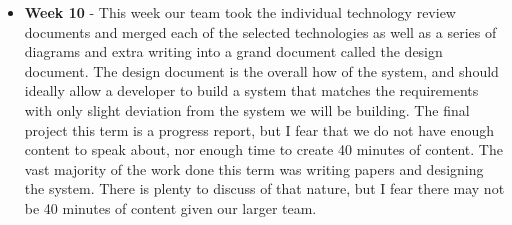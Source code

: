 \documentclass[onecolumn, draftclsnofoot,10pt, compsoc]{IEEEtran}
\begin{document}
\begin{itemize}
					\item \textbf{Week 10} - This week our team took the individual technology review documents and merged each of the selected technologies as well as a series of diagrams and extra writing into a grand document called the design document. The design document is the overall how of the system, and should ideally allow a developer to build a system that matches the requirements with only slight deviation from the system we will be building. The final project this term is a progress report, but I fear that we do not have enough content to speak about, nor enough time to create 40 minutes of content. The vast majority of the work done this term was writing papers and designing the system. There is plenty to discuss of that nature, but I fear there may not be 40 minutes of content given our larger team. 
				\end{itemize}
\end{document}
